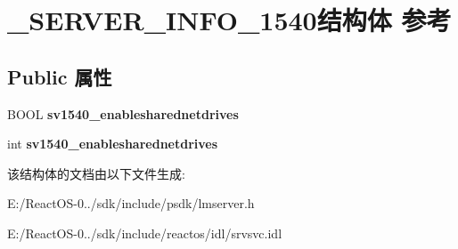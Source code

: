 \hypertarget{struct___s_e_r_v_e_r___i_n_f_o__1540}{}\section{\+\_\+\+S\+E\+R\+V\+E\+R\+\_\+\+I\+N\+F\+O\+\_\+1540结构体 参考}
\label{struct___s_e_r_v_e_r___i_n_f_o__1540}
\subsection*{Public 属性}
\begin{DoxyCompactItemize}
\item 
\mbox{\label{struct___s_e_r_v_e_r___i_n_f_o__1540_abf30136a2b02a55bf999f7199c4ba0a1}} 
B\+O\+OL {\bfseries sv1540\+\_\+enablesharednetdrives}
\item 
\mbox{\label{struct___s_e_r_v_e_r___i_n_f_o__1540_a3756400f121a51f3d222646945976512}} 
int {\bfseries sv1540\+\_\+enablesharednetdrives}
\end{DoxyCompactItemize}


该结构体的文档由以下文件生成\+:\begin{DoxyCompactItemize}
\item 
E\+:/\+React\+O\+S-\/0../sdk/include/psdk/lmserver.\+h\item 
E\+:/\+React\+O\+S-\/0../sdk/include/reactos/idl/srvsvc.\+idl\end{DoxyCompactItemize}
